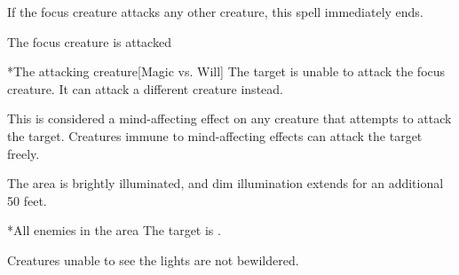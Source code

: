 \begin{spellheader}
    \spellspecial If the focus creature attacks any other creature, this spell immediately ends.
\end{spellheader}
\begin{spelleffects}
    \begin{spelltrigger}{The focus creature is attacked}
        \begin{spelltarget}*{The attacking creature}[Magic vs. Will]
            \spellsuccess The target is unable to attack the focus creature. It can attack a different creature instead.
        \end{spelltarget}
    \end{spelltrigger}

\end{spelleffects}
\begin{spellfooter}
    \spellnotes This is considered a mind-affecting effect on any creature that attempts to attack the target. Creatures immune to mind-affecting effects can attack the target freely.
\end{spellfooter}

\begin{spellheader}
    \spelldur{\durshort}
\end{spellheader}
\begin{spelleffects}
    \spelleffect The area is brightly illuminated, and dim illumination extends for an additional 50 feet.
    \begin{spelltarget}*{All enemies in the area}
        \spelleffect The target is \bewildered.
    \end{spelltarget}
\end{spelleffects}
\begin{spellfooter}
    \spellnotes Creatures unable to see the lights are not bewildered.
\end{spellfooter}

